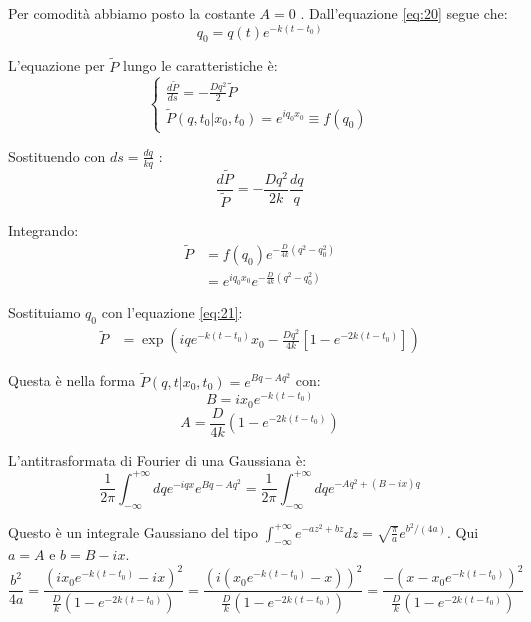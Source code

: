 Per comodità abbiamo posto la costante $A=0$ .
Dall'equazione \ref{eq:20} segue che:
\begin{equation}
q_0 = q(t) e^{-k (t-t_0)} 
\label{eq:21}
\end{equation}

L'equazione per $\tilde{P}$ lungo le caratteristiche è:
\begin{equation} \begin{cases}
\frac{d\tilde{P}}{ds} = -\frac{Dq^{2}}{2}\tilde{P} \\ \tilde{P}(q,t_{0}|x_{0},t_{0})=e^{iq_0x_{0}} \equiv f(q_0)\end{cases}
\end{equation}

Sostituendo con $ds = \frac{dq}{kq}$ :
\begin{equation}
\frac{d\tilde{P}}{\tilde{P}} = -\frac{Dq^2}{2k}\frac{dq}{q}
\end{equation}

Integrando:
\begin{align}
\tilde{P} &= f(q_0) e^{-\frac{D}{4k}(q^2-q_0^2) } \\  &= e^{iq_0x_{0}} e^{-\frac{D}{4k}(q^2-q_0^2) }
\end{align}

Sostituiamo $q_0$ con l'equazione \ref{eq:21}:
\begin{align}
\tilde{P}   &= \exp\left(iq e^{-k (t-t_0)} x_{0} -\frac{Dq^2}{4k}\left[1- e^{-2k (t-t_0)} \right] \right)
\end{align}

Questa è nella forma $\tilde{P}(q,t|x_{0},t_{0}) = e^{Bq-Aq^2}$ con:
\begin{equation}
B = ix_{0}e^{-k(t-t_{0})}
\end{equation}
\begin{equation}
A = \frac{D}{4k}(1-e^{-2k(t-t_{0})})
\end{equation}

L'antitrasformata di Fourier di una Gaussiana è:
\begin{equation} \frac{1}{2\pi}\int_{-\infty}^{+\infty}dq e^{-iqx}e^{Bq-Aq^2} = \frac{1}{2\pi}\int_{-\infty}^{+\infty}dq e^{-Aq^2 + (B-ix)q} \end{equation}

Questo è un integrale Gaussiano del tipo $\int_{-\infty}^{+\infty} e^{-az^2+bz}dz = \sqrt{\frac{\pi}{a}}e^{b^2/(4a)}$.
Qui $a=A$ e $b=B-ix$.
\begin{equation*}\frac{b^2}{4a} = \frac{( ix_{0}e^{-k(t-t_{0})}-ix)^2}{\frac{D}{k}(1-e^{-2k(t-t_{0})})} =\frac{(i(x_0 e^{-k(t-t_0)}-x  ))^2}{\frac{D}{k}(1-e^{-2k(t-t_{0})})} = \frac{-(x-x_0 e^{-k(t-t_0)})^2}{\frac{D}{k}(1-e^{-2k(t-t_{0})})}\end{equation*}

